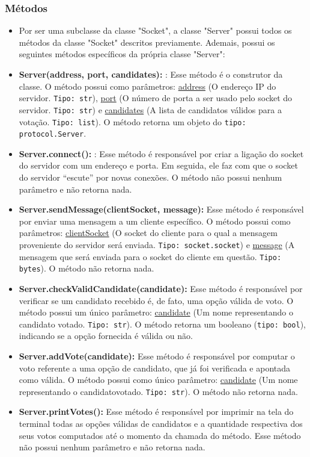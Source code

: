 \documentclass[10pt]{article}
\begin{document}
\begin{itemize}
        \subsubsection{\large Métodos}
            \begin{itemize}
            \item Por ser uma subclasse da classe "Socket", a classe "Server" possui todos os métodos da classe "Socket" descritos previamente. Ademais, possui os seguintes métodos específicos da própria classe "Server":
            \item \textbf{Server(address, port, candidates):} : Esse método é o construtor da classe. O método possui como parâmetros: \underline{address} (O endereço IP do servidor. \texttt{Tipo: str}), \underline{port} (O número de porta a ser usado pelo socket do servidor. \texttt{Tipo: str}) e \underline{candidates} (A lista de candidatos válidos para a votação. \texttt{Tipo: list}). O método retorna um objeto do \texttt{tipo: protocol.Server}.
            \item \textbf{Server.connect():} : Esse método é responsável por criar a ligação do socket do servidor com um endereço e porta. Em seguida, ele faz com que o socket do servidor “escute” por novas conexões. O método não possui nenhum parâmetro e não retorna nada.
            \item \textbf{Server.sendMessage(clientSocket, message):} Esse método é responsável por enviar uma mensagem a um cliente específico. O método possui como parâmetros: \underline{clientSocket} (O socket do cliente para o qual a mensagem proveniente do servidor será enviada. \texttt{Tipo: socket.socket}) e \underline{message} (A mensagem que será enviada para o socket do cliente em questão. \texttt{Tipo: bytes}). O método não retorna nada.
            \item \textbf{Server.checkValidCandidate(candidate):}  Esse método é responsável por verificar se um candidato recebido é, de fato, uma opção válida de voto. O método possui um único parâmetro: \underline{candidate} (Um nome representando o candidato votado. \texttt{Tipo: str}). O método retorna um booleano (\texttt{tipo: bool}), indicando se a opção fornecida é válida ou não.
            \item \textbf{Server.addVote(candidate):} Esse método é responsável por computar o voto referente a uma opção de candidato, que já foi verificada e apontada como válida. O método possui como único parâmetro: \underline{candidate} (Um nome representando o candidatovotado. \texttt{Tipo: str}). O método não retorna nada.
            \item \textbf{Server.printVotes():} Esse método é responsável por imprimir na tela do terminal todas as opções válidas de candidatos e a quantidade respectiva dos seus votos computados até o momento da chamada do método. Esse método não possui nenhum parâmetro e não retorna nada.
            \end{itemize}
        

\end{itemize}
\end{document}
